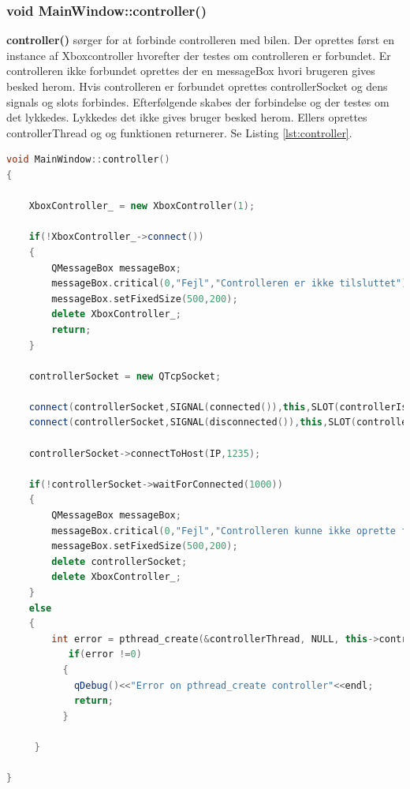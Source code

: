 \subsubsection{void MainWindow::controller()}
\textbf{controller()} sørger for at forbinde controlleren med bilen. Der oprettes først en instance af Xboxcontroller hvorefter der testes om controlleren er forbundet. Er controlleren ikke forbundet oprettes der en messageBox hvori brugeren gives besked herom. Hvis controlleren er forbundet oprettes controllerSocket og dens signals og slots forbindes. Efterfølgende skabes der forbindelse og der testes om det lykkedes. Lykkedes det ikke gives bruger besked herom. Ellers oprettes controllerThread og og funktionen returnerer. Se Listing \ref{lst:controller}.
\begin{lstlisting}[caption={controller},label=lst:controller, language=c++]
void MainWindow::controller()
{

    XboxController_ = new XboxController(1);

    if(!XboxController_->connect())
    {
        QMessageBox messageBox;
        messageBox.critical(0,"Fejl","Controlleren er ikke tilsluttet");
        messageBox.setFixedSize(500,200);
        delete XboxController_;
        return;
    }

    controllerSocket = new QTcpSocket;

    connect(controllerSocket,SIGNAL(connected()),this,SLOT(controllerIsConnected()),Qt::AutoConnection);
    connect(controllerSocket,SIGNAL(disconnected()),this,SLOT(controllerLostConnection()),Qt::AutoConnection);

    controllerSocket->connectToHost(IP,1235);

    if(!controllerSocket->waitForConnected(1000))
    {
        QMessageBox messageBox;
        messageBox.critical(0,"Fejl","Controlleren kunne ikke oprette forbindelse til bilen");
        messageBox.setFixedSize(500,200);
        delete controllerSocket;
        delete XboxController_;
    }
    else
    {
        int error = pthread_create(&controllerThread, NULL, this->controllerStreamHelper ,this);
           if(error !=0)
          {
            qDebug()<<"Error on pthread_create controller"<<endl;
            return;
          }

     }

}
\end{lstlisting}
